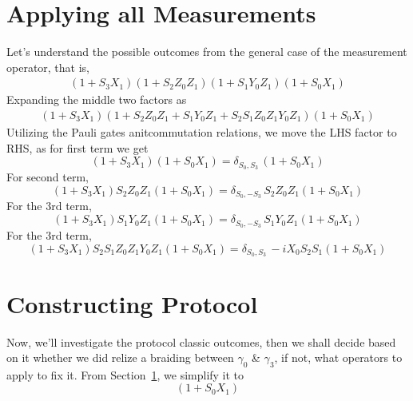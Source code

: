 \documentclass{article}
\begin{document}
\section{Applying all Measurements} %
\label{sec:Applying all Measurements}
Let's understand the possible outcomes from the general case of the measurement operator,
that is,
$$
	\begin{aligned}
		(1 +S_3 X_1) (1 +S_2 Z_0 Z_1) (1 +S_1 Y_0 Z_1) (1 +S_0 X_1)
		\label{eq:general meas}
	\end{aligned}
$$
Expanding the middle two factors as
$$
	\begin{aligned}
		(1 +S_3 X_1) (1 + S_2 Z_0 Z_1 + S_1 Y_0 Z_1 + S_2 S_1 Z_0 Z_1 Y_0 Z_1) (1 +S_0 X_1)
		\label{eq:expanding}
	\end{aligned}
$$
Utilizing the Pauli gates anitcommutation relations, we move the LHS factor to RHS,
as for first term we get
\begin{equation*}
	(1 +S_3 X_1) (1 +S_0 X_1) = \delta_{S_0,S_3}\, (1 +S_0 X_1)
\end{equation*}
For second term,
\begin{equation*}
	(1 +S_3 X_1) S_2 Z_0 Z_1 (1 +S_0 X_1) = \delta_{S_0,-S_3}\, S_2 Z_0 Z_1 (1 +S_0 X_1)
\end{equation*}
For the 3rd term,
\begin{equation*}
	(1 +S_3 X_1) S_1 Y_0 Z_1 (1 +S_0 X_1) = \delta_{S_0,-S_3}\, S_1 Y_0 Z_1 (1 +S_0 X_1)
\end{equation*}
For the 3rd term,
\begin{equation*}
	(1 +S_3 X_1) S_2 S_1 Z_0 Z_1 Y_0 Z_1 (1 +S_0 X_1) = \delta_{S_0,S_3}\, -i X_0 S_2 S_1 (1 +S_0 X_1)
\end{equation*}

\section{Constructing Protocol} %
\label{sec:Constructing Protocol}
Now, we'll investigate the protocol classic outcomes, then we shall decide based on it whether
we did relize a braiding between $ \gamma_0 $ \& $ \gamma_3 $, if not, what operators
to apply to fix it. From Section~\ref{sec:Applying all Measurements}, we simplify it to
\begin{equation*}
	[
		\delta_{S_0,S_3} + \delta_{S_0,-S_3}\, S_2 Z_0 Z_1
		+ \delta_{S_0,-S_3}\, S_1 Y_0 Z_1 + \delta_{S_0,S_3}\, -i X_0 S_2 S_1
	] (1 +S_0 X_1)
\end{equation*}
\end{document}

